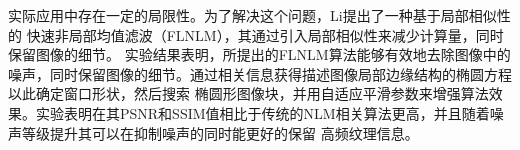 实际应用中存在一定的局限性。为了解决这个问题，Li提出了一种基于局部相似性的
快速非局部均值滤波（FLNLM）\cite{FastNonLocalMeansFilteringBasedOnLocalSimilarity2018}，其通过引入局部相似性来减少计算量，同时保留图像的细节。
实验结果表明，所提出的FLNLM算法能够有效地去除图像中的噪声，同时保留图像的细节。通过相关信息获得描述图像局部边缘结构的椭圆方程以此确定窗口形状，然后搜索
椭圆形图像块，并用自适应平滑参数来增强算法效果。实验表明在其PSNR和SSIM值相比于传统的NLM相关算法更高，并且随着噪声等级提升其可以在抑制噪声的同时能更好的保留
高频纹理信息。
